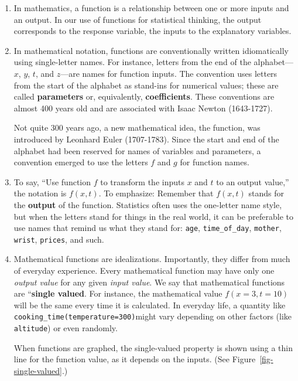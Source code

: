 \documentclass[
  letterpaper,
  DIV=11,
  numbers=noendperiod,
  oneside]{scrartcl}
\begin{document}
\begin{enumerate}
\def\labelenumi{\arabic{enumi}.}
\item
  In mathematics, a function is a relationship between one or more
  inputs and an output. In our use of functions for statistical
  thinking, the output corresponds to the response variable, the inputs
  to the explanatory variables.
\item
  In mathematical notation, functions are conventionally written
  idiomatically using single-letter names. For instance, letters from
  the end of the alphabet---\(x\), \(y\), \(t\), and \(z\)---are names
  for function inputs. The convention uses letters from the start of the
  alphabet as stand-ins for numerical values; these are called
  \textbf{parameters} or, equivalently, \textbf{coefficients}. These
  conventions are almost 400 years old and are associated with Isaac
  Newton (1643-1727).

  Not quite 300 years ago, a new mathematical idea, the function, was
  introduced by Leonhard Euler (1707-1783). Since the start and end of
  the alphabet had been reserved for names of variables and parameters,
  a convention emerged to use the letters \(f\) and \(g\) for function
  names.
\item
  To say, ``Use function \(f\) to transform the inputs \(x\) and \(t\)
  to an output value,'' the notation is \(f(x, t)\). To emphasize:
  Remember that \(f(x, t)\) stands for the \textbf{output} of the
  function. Statistics often uses the one-letter name style, but when
  the letters stand for things in the real world, it can be preferable
  to use names that remind us what they stand for: \texttt{age},
  \texttt{time\_of\_day}, \texttt{mother}, \texttt{wrist},
  \texttt{prices}, and such.
\item
  Mathematical functions are idealizations. Importantly, they differ
  from much of everyday experience. Every mathematical function may have
  only one \emph{output value} for any given \emph{input value}. We say
  that mathematical functions are ``\textbf{single valued}. For
  instance, the mathematical value \(f(x=3, t=10)\) will be the same
  every time it is calculated. In everyday life, a quantity like
  \texttt{cooking\_time(temperature=300)}might vary depending on other
  factors (like \texttt{altitude}) or even randomly.

  When functions are graphed, the single-valued property is shown using
  a thin line for the function value, as it depends on the inputs. (See
  Figure~\ref{fig-single-valued}.)
\end{enumerate}
\end{document}
